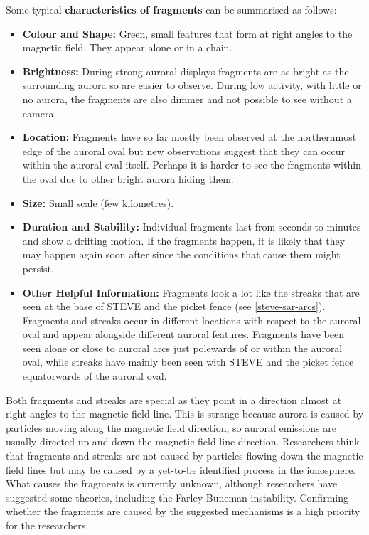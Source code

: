 \documentclass{article}
\begin{document}
Some typical {\bf characteristics of fragments} can be summarised as follows:
\begin{itemize}
    \item \textbf{Colour and Shape:} Green, small features that form at right angles to the magnetic field. They appear alone or in a chain. 
    \item \textbf{Brightness:} During strong auroral displays fragments are as bright as the surrounding aurora so are easier to observe. During low activity, with little or no aurora, the fragments are also dimmer and not possible to see without a camera.
    \item \textbf{Location:} Fragments have so far mostly been observed at the northernmost edge of the auroral oval but new observations suggest that they can occur within the auroral oval itself. Perhaps it is harder to see the fragments within the oval due to other bright aurora hiding them. 
    \item \textbf{Size:} Small scale (few kilometres).
    \item \textbf{Duration and Stability:} Individual fragments last from seconds to minutes and show a drifting motion. If the fragments happen, it is likely that they may happen again soon after since the conditions that cause them might persist. 
    \item \textbf{Other Helpful Information:} Fragments look a lot like the streaks that are seen at the base of STEVE and the picket fence (see \ref{steve-sar-arcs}). Fragments and streaks occur in different locations with respect to the auroral oval and appear alongside different auroral features. Fragments have been seen alone or close to auroral arcs just polewards of or within the auroral oval, while streaks have mainly been seen with STEVE and the picket fence equatorwards of the auroral oval. 
    \end{itemize}
 
Both fragments and streaks are special as they point in a direction almost at right angles to the magnetic field line. This is strange because aurora is caused by particles moving along the magnetic field direction, so auroral emissions are usually directed up and down the magnetic field line direction. Researchers think that fragments and streaks are not caused by particles flowing down the magnetic field lines but may be caused by a yet-to-be identified process in the ionosphere. What causes the fragments is currently unknown, although researchers have suggested some theories, including the Farley-Buneman instability. Confirming whether the fragments are caused by the suggested mechanisms is a high priority for the researchers. 
\end{document}
